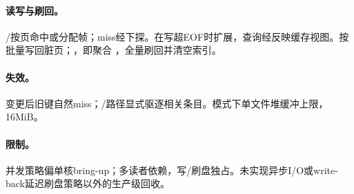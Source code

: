 \paragraph{读写与刷回。}
/按页命中或分配帧；miss经下探。在写超EOF时扩展，查询经反映缓存视图。按批量写回脏页；，即聚合 ，全量刷回并清空索引。

\paragraph{失效。}
变更后旧键自然miss；/路径显式驱逐相关条目。模式下单文件堆缓冲上限，16MiB。

\paragraph{限制。}
并发策略偏单核bring-up；多读者依赖，写/刷盘独占。未实现异步I/O或write-back延迟刷盘策略以外的生产级回收。
